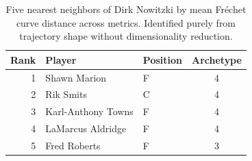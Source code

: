 \begin{table}[htbp]
  \centering\small
  \begin{tabular}{rllc}
    \toprule
    Rank & Player & Position & Archetype \\
    \midrule
    1 & Shawn Marion & F & 4 \\
    2 & Rik Smits & C & 4 \\
    3 & Karl-Anthony Towns & F & 4 \\
    4 & LaMarcus Aldridge & F & 4 \\
    5 & Fred Roberts & F & 3 \\
    \bottomrule
  \end{tabular}
  \caption{Five nearest neighbors of Dirk Nowitzki by mean Fr\'{e}chet curve distance across metrics. Identified purely from trajectory shape without dimensionality reduction.}
  \label{tab:Dirk_Nowitzki_frechet_curve_neighbors}
\end{table}

